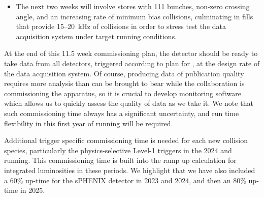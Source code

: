 \begin{itemize}
\item The next two weeks will involve stores with 111 bunches,
  non-zero crossing angle, and an increasing rate of minimum bias
  collisions, culminating in fills that provide 15--20~kHz of
  collisions in order to stress test the data acquisition system under
  target running conditions.

\end{itemize}

At the end of this 11.5 week commissioning plan, the detector should be
ready to take data from all detectors, triggered according to plan for
\auau, at the design rate of the data acquisition system.  Of course,
producing data of publication quality requires more analysis than can
be brought to bear while the collaboration is commissioning the
apparatus, so it is crucial to develop monitoring software which
allows us to quickly assess the quality of data as we take it.  We
note that such commissioning time always has a significant uncertainty,
and run time flexibility in this first year of running will be
required.

Additional trigger specific commissioning time is needed for each new
collision species, particularly the physics-selective Level-1 triggers
in the 2024 \pp and \pau running.  This commissioning time is built
into the ramp up calculation for integrated luminosities in these
periods.  We highlight that we have also included a 60\% up-time for
the sPHENIX detector in 2023 and 2024, and then an 80\% up-time in
2025.

